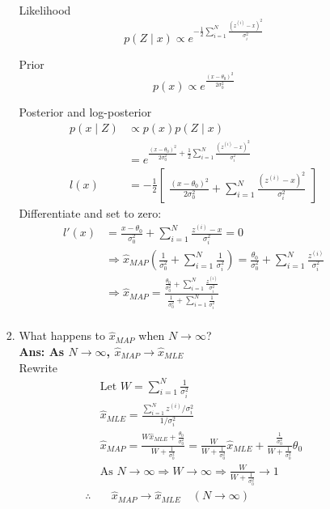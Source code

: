 \documentclass{article}
\theoremstyle{definition}
\theoremstyle{remark}
\begin{document}
\begin{enumerate}[font={\Large\bfseries},left=0pt]
\begin{tcolorbox}
\begin{enumerate}
\begin{enumerate}
        Likelihood
        $$
        p(Z \mid x) \propto e^{-\frac{1}{2} \sum^N_{i = 1} \frac{(z^{(i)} - x )^2}{\sigma_i^2}}
        $$
        
        Prior
        $$
        p(x) \propto e^{\frac{(x - \theta_0)^2}{2\sigma_0^2}}
        $$

        Posterior and log-posterior
        \begin{align}
        p(x \mid Z) &\propto p(x)p(Z \mid x) \\
                    & =  e^{\frac{(x - \theta_0)^2}{2\sigma_0^2} + \frac{1}{2}\sum^{N}_{i = 1} \frac{(z^{(i)} - x )^2}{\sigma_i^2} } \\
        l(x) &= -\frac{1}{2} \begin{bmatrix} \frac{(x - \theta_0)^2}{2\sigma_0^2} + \sum^{N}_{i = 1} \frac{(z^{(i)} - x )^2}{\sigma_i^2} \end{bmatrix}
        \end{align}
        Differentiate and set to zero:
        \begin{align}
            l'(x) &= \frac{x - \theta_0}{\sigma^2_0} + \sum^N_{i= 1} \frac{z^{(i)} - x}{\sigma^2_i} = 0 \\
                  &\Rightarrow \hat{x}_{MAP}(\frac{1}{\sigma_0^2} + \sum^N_{i=1} \frac{1}{\sigma^2_i}) = \frac{\theta_0}{\sigma^2_0} + \sum^N_{i = 1} \frac{z^{(i)}}{\sigma^2_i} \\
                  &\Rightarrow \hat{x}_{MAP} = \frac{\frac{\theta_0}{\sigma^2_0} + \sum^N_{i = 1} \frac{z^{(i)}}{\sigma^2_i}}{\frac{1}{\sigma_0^2} + \sum^N_{i=1} \frac{1}{\sigma^2_i}} \\
        \end{align} 
        \item What happens to $\hat{x}_{MAP}$ when $N \rightarrow \infty$? \\
        \textbf{Ans: As $N \rightarrow \infty$, $\hat{x}_{MAP} \rightarrow \hat{x}_{MLE}$} \\
        Rewrite 
        \begin{align}
            &\text{Let } W = \sum^{N}_{i=1}\frac{1}{\sigma_i^2} \\
            &\hat{x}_{MLE} = \frac{\sum^{N}_{i= 1} z^{(i)}/\sigma_i^2}{1/\sigma_i^2} \\
            &\hat{x}_{MAP} = \frac{W\hat{x}_{MLE} + \frac{\theta_0}{\sigma_0^2}}{W + \frac{1}{\sigma^2_0}} = \frac{W}{W+ \frac{1}{\sigma^2_0}} \hat{x}_{MLE} + \frac{\frac{1}{\sigma_0^2}}{W + \frac{1}{\sigma^2_0}}\theta_0 \\
            &\text{As } N \rightarrow \infty \Rightarrow W \rightarrow \infty \Rightarrow \frac{W}{W+ \frac{1}{\sigma^2_0}} \rightarrow 1 \\
            \therefore &\quad\hat{x}_{MAP} \rightarrow \hat{x}_{MLE} \quad (N \rightarrow \infty)
        \end{align}
    \end{enumerate}
    \end{enumerate}
\end{tcolorbox}



\end{enumerate}
\end{document}
